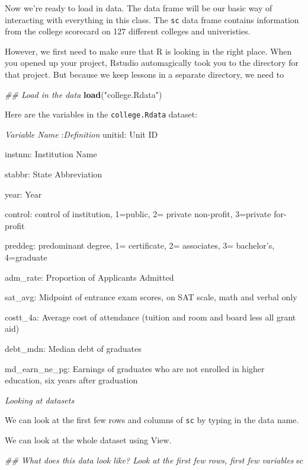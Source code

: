 \documentclass[
]{article}
\newenvironment{Shaded}{\begin{snugshade}}{\end{snugshade}}
\newcommand{\CommentTok}[1]{\textcolor[rgb]{0.56,0.35,0.01}{\textit{#1}}}
\newcommand{\KeywordTok}[1]{\textcolor[rgb]{0.13,0.29,0.53}{\textbf{#1}}}
\newcommand{\NormalTok}[1]{#1}
\newcommand{\StringTok}[1]{\textcolor[rgb]{0.31,0.60,0.02}{#1}}
\begin{document}
Now we're ready to load in data. The data frame will be our basic way of
interacting with everything in this class. The \texttt{sc} data frame
contains information from the college scorecard on 127 different
colleges and univeristies.

However, we first need to make sure that R is looking in the right
place. When you opened up your project, Rstudio automagically took you
to the directory for that project. But because we keep lessons in a
separate directory, we need to

\begin{Shaded}
\begin{Highlighting}[]
\CommentTok{## Load in the data}
\KeywordTok{load}\NormalTok{(}\StringTok{"college.Rdata"}\NormalTok{)}
\end{Highlighting}
\end{Shaded}

Here are the variables in the \texttt{college.Rdata} dataset:

\emph{Variable Name} :\emph{Definition} unitid: Unit ID

instnm: Institution Name

stabbr: State Abbreviation

year: Year

control: control of institution, 1=public, 2= private non-profit,
3=private for-profit

preddeg: predominant degree, 1= certificate, 2= associates, 3=
bachelor's, 4=graduate

adm\_rate: Proportion of Applicants Admitted

sat\_avg: Midpoint of entrance exam scores, on SAT scale, math and
verbal only

costt\_4a: Average cost of attendance (tuition and room and board less
all grant aid)

debt\_mdn: Median debt of graduates

md\_earn\_ne\_pg: Earnings of graduates who are not enrolled in higher
education, six years after graduation

\emph{Looking at datasets}

We can look at the first few rows and columns of \texttt{sc} by typing
in the data name.

We can look at the whole dataset using View.

\begin{Shaded}
\begin{Highlighting}[]
\CommentTok{## What does this data look like? Look at the first few rows, first few variables}
\NormalTok{sc}
\end{Highlighting}
\end{Shaded}
\end{document}
